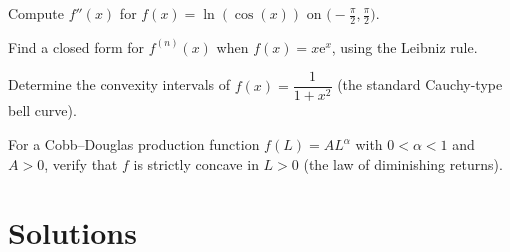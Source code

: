 \begin{problems}
  \item Compute $f''(x)$ for $f(x)=\ln(\cos(x))$ on
        $\bigl(-\tfrac{\pi}{2},\tfrac{\pi}{2}\bigr)$.
  \item Find a closed form for $f^{(n)}(x)$ when $f(x)=x\mathrm{e}^{x}$,
        using the Leibniz rule.
  \item Determine the convexity intervals of $f(x)=\dfrac{1}{1+x^{2}}$ (the
        standard Cauchy-type bell curve).
  \item For a Cobb--Douglas production function $f(L)=AL^{\alpha}$ with
        $0<\alpha<1$ and $A>0$, verify that $f$ is strictly concave in
        $L>0$ (the law of diminishing returns).
\end{problems}

\section{Solutions}

